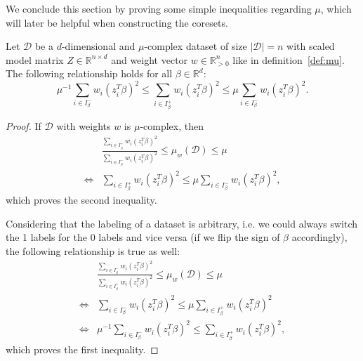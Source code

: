 We conclude this section by proving some simple inequalities
regarding $\mu$, which will later be helpful when constructing the
coresets.

\begin{lemma}
    \label{lemma:mu-inequalities}
    Let $\mathcal{D}$ be a $d$-dimensional and $\mu$-complex dataset of size
    $|\mathcal{D}|=n$ with scaled
    model matrix $Z \in \mathbb{R}^{n \times d}$ and weight
    vector $w \in \mathbb{R}^n_{>0}$ like in
    definition~\ref{def:mu}.
    The following relationship holds for all $\beta \in \mathbb{R}^d$:
    \begin{equation*}
        \mu^{-1} \sum_{i \in I_\beta^-} w_i (z_i^T \beta)^2
        \leq \sum_{i \in I_\beta^+} w_i (z_i^T \beta)^2
        \leq \mu \sum_{i \in I_\beta^-} w_i (z_i^T \beta)^2.
    \end{equation*}
\end{lemma}
\begin{proof}
    If $\mathcal{D}$ with weights $w$ is $\mu$-complex, then
    \begin{align*}
             & \frac{\sum_{i \in I_\beta^+} w_i (z_i^T \beta)^2}{\sum_{i \in I_\beta^-} w_i (z_i^T \beta)^2}
        \leq \mu_w(\mathcal{D}) \leq \mu                                                                     \\
        \iff &
        \sum_{i \in I_\beta^+} w_i (z_i^T \beta)^2
        \leq \mu \sum_{i \in I_\beta^-} w_i (z_i^T \beta)^2,
    \end{align*}
    which proves the second inequality.

    Considering that the labeling of a dataset is arbitrary, i.e. we
    could always switch the 1 labels for the 0 labels and vice versa
    (if we flip the sign of $\beta$
    accordingly),
    the following relationship is true as well:
    \begin{align*}
             & \frac{\sum_{i \in I_\beta^-} w_i (z_i^T \beta)^2}{\sum_{i \in I_\beta^+} w_i (z_i^T \beta)^2}
        \leq \mu_w(\mathcal{D}) \leq \mu                                                                     \\
        \iff &
        \sum_{i \in I_\beta^-} w_i (z_i^T \beta)^2
        \leq \mu \sum_{i \in I_\beta^+} w_i (z_i^T \beta)^2                                                  \\
        \iff &
        \mu^{-1} \sum_{i \in I_\beta^-} w_i (z_i^T \beta)^2
        \leq \sum_{i \in I_\beta^+} w_i (z_i^T \beta)^2,
    \end{align*}
    which proves the first inequality.
\end{proof}
